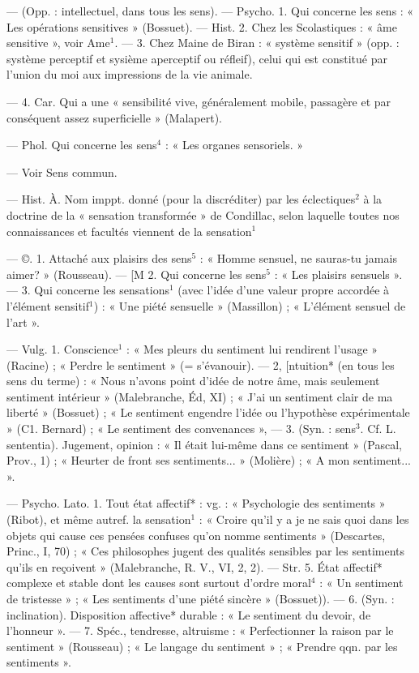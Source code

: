 \begin{itemize}[leftmargin=1cm, label=, itemsep=1pt]
 — (Opp. : intellectuel, dans
tous les sens). — Psycho. 1. Qui
concerne les sens : « Les opérations
sensitives » (Bossuet). — Hist. 2.
Chez les Scolastiques : « âme sensitive », voir Ame$^1$. — 3. Chez Maine de
Biran : « système sensitif » (opp. :
système perceptif et sysième aperceptif ou réfleif), celui qui est
constitué par l’union du moi aux
impressions de la vie animale.

— 4. Car. Qui a une « sensibilité
vive, généralement mobile, passagère et par conséquent assez superficielle » (Malapert).

 — Phol. Qui concerne les
sens$^4$ : « Les organes sensoriels. »

 — Voir Sens commun.

 — Hist. À. Nom imppt.
donné (pour la discréditer) par les
éclectiques$^2$ à la doctrine de la « sensation transformée » de Condillac,
selon laquelle toutes nos connaissances et facultés viennent de la
sensation$^1$

 — ©. 1. Attaché aux plaisirs
des sens$^5$ : « Homme sensuel, ne
sauras-tu jamais aimer? » (Rousseau). — [M 2. Qui concerne les
sens$^5$ : « Les plaisirs sensuels ». —
3. Qui concerne les sensations$^1$ (avec
l’idée d’une valeur propre accordée
à l'élément sensitif$^1$) : « Une piété
sensuelle » (Massillon) ; « L'élément
sensuel de l’art ».

 — Vulg. 1. Conscience$^1$ :
« Mes pleurs du sentiment lui rendirent l’usage » (Racine) ; « Perdre le
sentiment » (= s’évanouir). — 2, [ntuition* (en tous les sens du terme) :
« Nous n’avons point d'idée de notre
âme, mais seulement sentiment intérieur » (Malebranche, Éd, XI) ;
« J’ai un sentiment clair de ma
liberté » (Bossuet) ; « Le sentiment
engendre l’idée ou l'hypothèse expérimentale » (C1. Bernard) ; « Le sentiment des convenances », — 3. (Syn. :
sens$^3$. Cf. L. sententia). Jugement,
opinion : « Il était lui-même dans ce
sentiment » (Pascal, Prov., 1) ;
« Heurter de front ses sentiments... »
(Molière) ; « A mon sentiment... ».

— Psycho. Lato. 1. Tout état
affectif* : vg. : « Psychologie des
sentiments » (Ribot), et même autref. la sensation$^1$ : « Croire qu'il y
a je ne sais quoi dans les objets qui
cause ces pensées confuses qu’on
nomme sentiments » (Descartes,
Princ., I, 70) ; « Ces philosophes
jugent des qualités sensibles par les
sentiments qu'ils en reçoivent »
(Malebranche, R. V., VI, 2, 2). —
Str. 5. État affectif* complexe et
stable dont les causes sont surtout
d'ordre moral$^4$ : « Un sentiment de
tristesse » ; « Les sentiments d’une
piété sincère » (Bossuet)). — 6. (Syn. :
inclination). Disposition affective*
durable : « Le sentiment du devoir,
de l'honneur ». — 7. Spéc., tendresse,
altruisme : « Perfectionner la raison
par le sentiment » (Rousseau) ; « Le
langage du sentiment » ; « Prendre
qqn. par les sentiments ».


\end{itemize}
